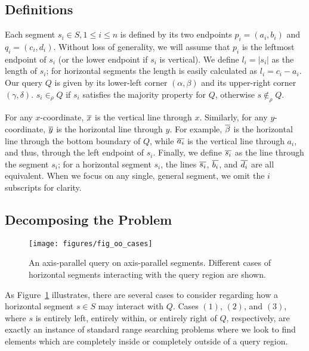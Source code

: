 \subsection{Definitions}
\label{:rectangles:ap:defs}

Each segment $s_i \in S, 1 \leq i \leq n$ is defined by its two endpoints $p_i = (a_i, b_i)$ and $q_i = (c_i, d_i)$. 
Without loss of generality, we will assume that $p_i$ is the leftmost endpoint of $s_i$ (or the lower endpoint if $s_i$ is vertical). 
We define $l_i = |s_i|$ as the length of $s_i$; for horizontal segments the length is easily calculated as $l_i = c_i - a_i$. 
Our query $Q$ is given by its lower-left corner $(\alpha, \beta)$ and its upper-right corner $(\gamma, \delta)$. 
$s_i \in_\rho Q$ if $s_i$ satisfies the majority property for $Q$, otherwise $s \not \in_\rho Q$.

For any $x$-coordinate, $\overline{x}$ is the vertical line through $x$. Similarly, for any $y$-coordinate, $\overline{y}$ is the horizontal line through $y$. For example, $\overline{\beta}$ is the horizontal line through the bottom boundary of $Q$, while $\overline{a_i}$ is the vertical line through $a_i$, and thus, through the left endpoint of $s_i$. Finally, we define $\overline{s_i}$ as the line through the segment $s_i$; for a horizontal segment $s_i$, the lines $\overline{s_i}$, $\overline{b_i}$, and $\overline{d_i}$ are all equivalent. When we focus on any single, general segment, we omit the $i$ subscripts for clarity.


\subsection{Decomposing the Problem}
\label{:rectangles:ap:approach}

\begin{figure}[t]
\centering
\texttt{[image: figures/fig\_oo\_cases]}
\caption[The different cases of axis-parallel segments.]{An axis-parallel query on axis-parallel segments. Different cases of horizontal segments interacting with the query region are shown.}
\label{:fig:rectangles:ap:cases}
\end{figure}

As Figure~\ref{:fig:rectangles:ap:cases} illustrates, there are several cases to consider regarding how a horizontal segment $s \in S$ may interact with $Q$. Cases $(1)$, $(2)$, and $(3)$, where $s$ is entirely left, entirely within, or entirely right of $Q$, respectively, are exactly an instance of  standard range searching problems where we look to find elements which are completely inside or completely outside of a query region.  

